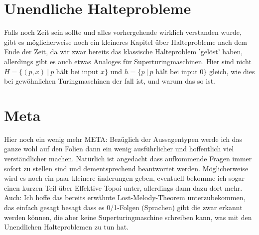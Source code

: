 \documentclass{scrartcl}
\begin{document}
\section{Unendliche Halteprobleme}
Falls noch Zeit sein sollte und alles vorhergehende wirklich verstanden wurde,
gibt es möglicherweise noch ein kleineres Kapitel über Halteprobleme nach dem
Ende der Zeit, da wir zwar bereits das klassische Halteproblem 'gelöst' haben,
allerdings gibt es auch etwas Analoges für Superturingmaschinen. Hier sind
nicht $H = \{(p, x)\ |\ p$ hält bei input $x\}$ und $h = \{p\ |\ p$ hält bei
input $0 \}$ gleich, wie dies bei gewöhnlichen Turingmaschinen der fall ist,
und warum das so ist.



\section{Meta}
Hier noch ein wenig mehr META: Bezüglich der Aussagentypen werde ich das ganze
wohl auf den Folien dann ein wenig ausführlicher und hoffentlich viel
verständlicher machen. Natürlich ist angedacht dass aufkommende Fragen immer
sofort zu stellen sind und dementsprechend beantwortet werden. Möglicherweise
wird es noch ein paar kleinere änderungen geben, eventuell bekomme ich sogar
einen kurzen Teil über Effektive Topoi unter, allerdings dann dazu dort mehr.
Auch: Ich hoffe das bereits erwähnte Lost-Melody-Theorem unterzubekommen, das
einfach gesagt besagt dass es 0/1-Folgen (Sprachen) gibt die zwar erkannt
werden können, die aber keine Superturingmaschine schreiben kann, was mit den
Unendlichen Halteproblemen zu tun hat.
\end{document}

